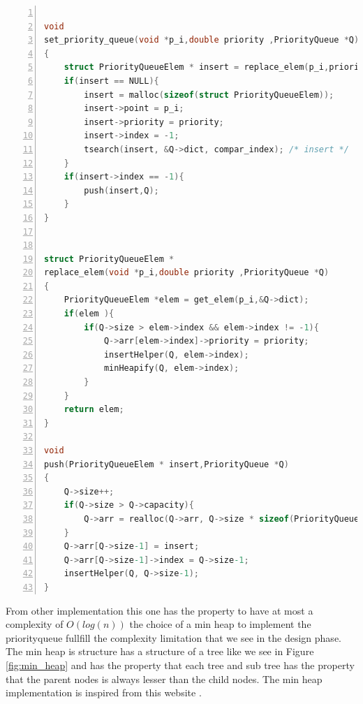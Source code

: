 \begin{minipage}{\linewidth}
\begin{lstlisting}[language=C, % Spécifie le langage du code
caption={PriorityQueue Set Elem}, % Légende du listing
label=lst:prqueueMethodSet_c, % Étiquette pour référencer le listing
numbers=left,
numberstyle=\tiny\color{gray},
stepnumber=1,
frame=single,
breaklines=true,
postbreak=\mbox{\textcolor{red}{$\hookrightarrow$}\space},
showstringspaces=false
]

void
set_priority_queue(void *p_i,double priority ,PriorityQueue *Q)
{
	struct PriorityQueueElem * insert = replace_elem(p_i,priority,Q);
	if(insert == NULL){
		insert = malloc(sizeof(struct PriorityQueueElem));
		insert->point = p_i;
		insert->priority = priority;
		insert->index = -1;
		tsearch(insert, &Q->dict, compar_index); /* insert */
	}
	if(insert->index == -1){
		push(insert,Q);
	}
}


struct PriorityQueueElem *
replace_elem(void *p_i,double priority ,PriorityQueue *Q)
{
	PriorityQueueElem *elem = get_elem(p_i,&Q->dict);
	if(elem ){
		if(Q->size > elem->index && elem->index != -1){
			Q->arr[elem->index]->priority = priority;
			insertHelper(Q, elem->index);
			minHeapify(Q, elem->index);
		}
	}
	return elem;
}
	
void
push(PriorityQueueElem * insert,PriorityQueue *Q)
{
	Q->size++;
	if(Q->size > Q->capacity){
		Q->arr = realloc(Q->arr, Q->size * sizeof(PriorityQueueElem*));
	}
	Q->arr[Q->size-1] = insert;
	Q->arr[Q->size-1]->index = Q->size-1;
	insertHelper(Q, Q->size-1);
}

\end{lstlisting}
\end{minipage}
\vspace{1cm}

From other implementation this one has the property to have at most a complexity of $O(log(n))$ the choice of a min heap to implement the priorityqueue fullfill the complexity limitation that we see in the design phase. The min heap is structure has a structure of a tree like we see in Figure \ref{fig:min_heap} and has the property that each tree and sub tree has the property that the parent nodes is always lesser than the child nodes. The min heap implementation is inspired from this website \cite{GfG_2023}. 



